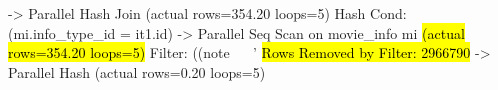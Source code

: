 \documentclass{beamer}
\begin{document}

\newsavebox\zoomplan
\begin{lrbox}{\zoomplan}\begin{minipage}{0.93\textwidth}
\begin{plan}[fontsize=\tiny]
->  Parallel Hash Join (actual rows=354.20 loops=5)
      Hash Cond: (mi.info_type_id = it1.id)
      ->  Parallel Seq Scan on movie_info mi \hl{(actual rows=354.20 loops=5)}
            Filter: ((note ~~ '%
            \hl{Rows Removed by Filter: 2966790}
      ->  Parallel Hash (actual rows=0.20 loops=5)
\end{plan}
\end{minipage}\end{lrbox}
\end{document}
